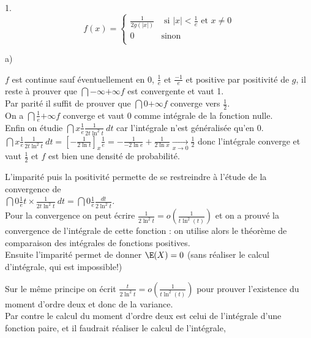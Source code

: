 \documentclass[11pt]{article}%
\begin{document}
\begin{exercice}
\begin{noliste}{1.}
\[
 f(x) = \left\{ 
\begin{array}{ll}
 \frac{1}{2 g (| x |)} & \text{ si } | x | < \frac{1}{e} \text{ et } x
\neq 0 \\
0 & \text{sinon} \\
\end{array}
\right. 
\]
 \begin{noliste}{a)}
 \setlength{\itemsep}{2mm}
 \item $f$ est continue sauf éventuellement en 0, $\frac{1}{e}$ et
$\frac{-1}{e}$ et positive par positivité de $g$, il reste à prouver
que $\dint{-\infty}{+ \infty} f $ est convergente et vaut 1. \\
 Par parité il suffit de prouver que $\dint{0}{+ \infty} f $ converge
vers $\frac{1}{2}$. \\
 On a $\dint{\frac{1}{e} }{+ \infty} f$ converge et vaut 0 comme
intégrale de la fonction nulle. \\
 Enfin on étudie $\dint{x}{\frac{1}{e} } \frac{1}{2 t \ln^{2} t}\ dt$
car l'intégrale n'est généralisée qu'en 0. \\
 $\dint{x}{\frac{1}{e} } \frac{1}{2t \ln^{2} t}\ dt = \left[ -
\frac{1}{2\ln t} \right]_{x}{\frac{1}{e} } = - \frac{1}{-2 \ln e } +
\frac{1}{ 2 \ln x} \xrightarrow[ x \rightarrow 0]{} \frac{1}{2}$ donc
l'intégrale converge et vaut $\frac{1}{2}$ et $f$ est bien une densité
de probabilité. \\
 \item L'imparité puis la positivité permette de se restreindre à
l'étude de la convergence de \\
$\dint{0}{\frac{1}{e} } t \times \frac{1}{2 t \ln^{2} t}\ dt =
\dint{0}{ \frac{1}{e} } \frac{dt}{2 \ln^{2} t}$. \\
 Pour la convergence on peut écrire $ \frac{1}{2 \ln^{2} t} = o \left(
\frac{1}{t \ln^{2} (t)} \right)$ et on a prouvé la convergence de
l'intégrale de cette fonction : on utilise alors le théorème de
comparaison des intégrales de fonctions positives. \\
 Ensuite l'imparité permet de donner $\E(X) = 0$ (sans réaliser le
calcul d'intégrale, qui est impossible!) \\
 \item Sur le même principe on écrit $ \frac{t}{ 2 \ln^{2} t} = o
\left( \frac{1}{t \ln^{2} (t)} \right)$ pour prouver l'existence du
moment d'ordre deux et donc de la variance. \\
 Par contre le calcul du moment d'ordre deux est celui de l'intégrale
d'une fonction paire, et il faudrait réaliser le calcul de l'intégrale,

\end{noliste}
\end{noliste}
\end{exercice}
\end{document}
